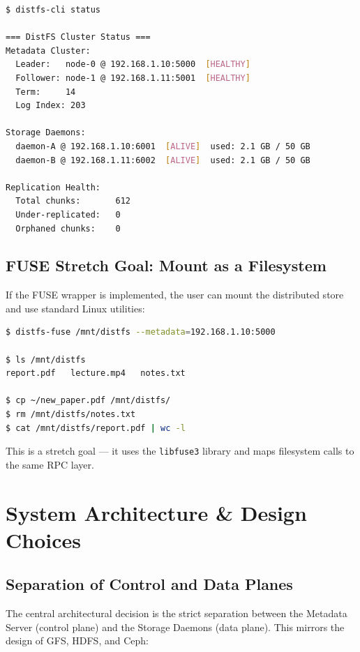 \documentclass[12pt,a4paper]{article}
\begin{document}
\begin{lstlisting}[language=bash, caption={System status output}]
$ distfs-cli status

=== DistFS Cluster Status ===
Metadata Cluster:
  Leader:   node-0 @ 192.168.1.10:5000  [HEALTHY]
  Follower: node-1 @ 192.168.1.11:5001  [HEALTHY]
  Term:     14
  Log Index: 203

Storage Daemons:
  daemon-A @ 192.168.1.10:6001  [ALIVE]  used: 2.1 GB / 50 GB
  daemon-B @ 192.168.1.11:6002  [ALIVE]  used: 2.1 GB / 50 GB

Replication Health:
  Total chunks:       612
  Under-replicated:   0
  Orphaned chunks:    0
\end{lstlisting}

\subsection{FUSE Stretch Goal: Mount as a Filesystem}

If the FUSE wrapper is implemented, the user can mount the distributed store and use standard Linux utilities:

\begin{lstlisting}[language=bash, caption={FUSE mount usage}]
$ distfs-fuse /mnt/distfs --metadata=192.168.1.10:5000

$ ls /mnt/distfs
report.pdf   lecture.mp4   notes.txt

$ cp ~/new_paper.pdf /mnt/distfs/
$ rm /mnt/distfs/notes.txt
$ cat /mnt/distfs/report.pdf | wc -l
\end{lstlisting}

This is a stretch goal — it uses the \texttt{libfuse3} library and maps filesystem calls to the same RPC layer.

\section{System Architecture \& Design Choices}

\subsection{Separation of Control and Data Planes}

The central architectural decision is the strict separation between the Metadata Server (control plane) and the Storage Daemons (data plane). This mirrors the design of GFS, HDFS, and Ceph:
\end{document}
